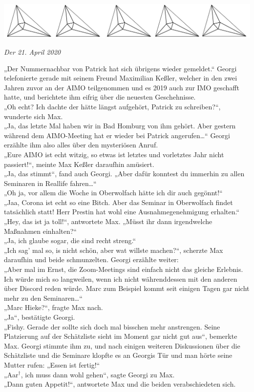 \documentclass[oneside]{memoir}
\newcommand{\parasep}{
\bigskip
\bigskip
\begin{center} 
   \includegraphics[scale=.08]{parasep5.jpg} 
\end{center}
\bigskip
\bigskip
}
\begin{document}
\parasep

\textit{Der 21. April 2020}

\medskip
\noindent „Der Nummernachbar von Patrick hat sich übrigens wieder gemeldet.“ Georgi telefonierte gerade mit seinem Freund Maximilian Keßler, welcher in den zwei Jahren zuvor an der AIMO teilgenommen und es 2019 auch zur IMO geschafft hatte, und berichtete ihm eifrig über die neuesten Geschehnisse. \\
„Oh echt? Ich dachte der hätte längst aufgehört, Patrick zu schreiben?“, wunderte sich Max. \\
„Ja, das letzte Mal haben wir in Bad Homburg von ihm gehört. Aber gestern während dem AIMO-Meeting hat er wieder bei Patrick angerufen\ldots“ Georgi erzählte ihm also alles über den mysteriösen Anruf. \\
„Eure AIMO ist echt witzig, so etwas ist letztes und vorletztes Jahr nicht passiert!“, meinte Max Keßler daraufhin amüsiert. \\
„Ja, das stimmt“, fand auch Georgi. „Aber dafür konntest du immerhin zu allen Seminaren in Reallife fahren\ldots“ \\
„Oh ja, vor allem die Woche in Oberwolfach hätte ich dir auch gegönnt!“ \\
„Jaa, Corona ist echt so eine Bitch. Aber das Seminar in Oberwolfach findet tatsächlich statt! Herr Prestin hat wohl eine Ausnahmegenehmigung erhalten.“ \\
„Hey, das ist ja toll!“, antwortete Max. „Müsst ihr dann irgendwelche Maßnahmen einhalten?“ \\
„Ja, ich glaube sogar, die sind recht streng.“ \\
„Ich sag' mal so, is nicht schön, aber wat willste machen?“, scherzte Max daraufhin und beide schmunzelten. Georgi erzählte weiter: \\
„Aber mal im Ernst, die Zoom-Meetings sind einfach nicht das gleiche Erlebnis. Ich würde mich so langweilen, wenn ich nicht währenddessen mit den anderen über Discord reden würde. Marc zum Beispiel kommt seit einigen Tagen gar nicht mehr zu den Seminaren\ldots“ \\
„Marc Hieke?“, fragte Max nach. \\
„Ja“, bestätigte Georgi. \\
„Fishy. Gerade der sollte sich doch mal bisschen mehr anstrengen. Seine Platzierung auf der Schätzliste sieht im Moment gar nicht gut aus“, bemerkte Max. Georgi stimmte ihm zu, und nach einigen weiteren Diskussionen über die Schätzliste und die Seminare klopfte es an Georgis Tür und man hörte seine Mutter rufen: „Essen ist fertig!“ \\
„Aar$^{\dagger}$, ich muss dann wohl gehen“, sagte Georgi zu Max. \\
„Dann guten Appetit!“, antwortete Max und die beiden verabschiedeten sich.
     
\end{document}

